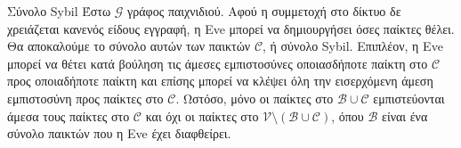 {}
\begin{definitiongr}{Σύνολο \textlatin{Sybil}}
  Έστω $\mathcal{G}$ γράφος παιχνιδιού. Αφού η συμμετοχή στο δίκτυο δε χρειάζεται κανενός είδους εγγραφή, η \textlatin{Eve}
  μπορεί να δημιουργήσει όσες παίκτες θέλει. Θα αποκαλούμε το σύνολο αυτών των παικτών $\mathcal{C}$, ή σύνολο
  \textlatin{Sybil}. Επιπλέον, η \textlatin{Eve} μπορεί να θέτει κατά βούληση τις άμεσες εμπιστοσύνες οποιασδήποτε παίκτη στο
  $\mathcal{C}$ προς οποιαδήποτε παίκτη και επίσης μπορεί να κλέψει όλη την εισερχόμενη άμεση εμπιστοσύνη προς παίκτες στο
  $\mathcal{C}$. Ωστόσο, μόνο οι παίκτες στο $\mathcal{B} \cup \mathcal{C}$ εμπιστεύονται άμεσα τους παίκτες στο $\mathcal{C}$
  και όχι οι παίκτες στο $\mathcal{V} \setminus (\mathcal{B} \cup \mathcal{C})$, όπου $\mathcal{B}$ είναι ένα σύνολο παικτών
  που η \textlatin{Eve} έχει διαφθείρει.
\end{definitiongr}
